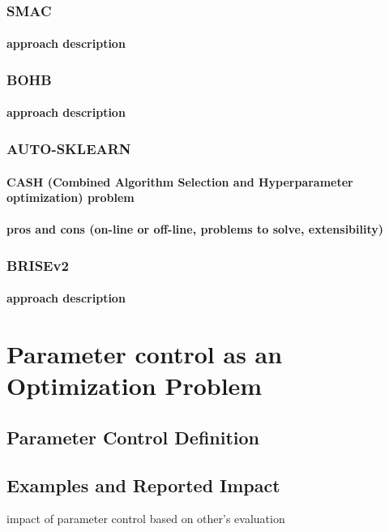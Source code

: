 \subsubsection{SMAC}
\paragraph{approach description}

\subsubsection{BOHB}
\paragraph{approach description}

\subsubsection{AUTO-SKLEARN}
\paragraph{CASH (Combined Algorithm Selection and Hyperparameter optimization) problem}
\paragraph{pros and cons (on-line or off-line, problems to solve, extensibility)}\cite{autosklearn:feurer2015efficient}

\subsubsection{BRISEv2}
\paragraph{approach description}


\section{Parameter control as an Optimization Problem}\label{bg: parameter control}
\subsection{Parameter Control Definition}
\subsection{Examples and Reported Impact}
impact of parameter control based on other's evaluation


